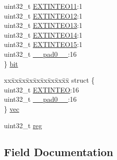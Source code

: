 \begin{DoxyCompactItemize}
\begin{tabbing}
\>uint32\_t \mbox{\hyperlink{union_e_i_c___e_v_c_t_r_l___type_a714c9d160c0d894359b24f3d48662688}{EXTINTEO11}}:1\\
\>uint32\_t \mbox{\hyperlink{union_e_i_c___e_v_c_t_r_l___type_a8f5262d42d527ac6f7452a173ed10dab}{EXTINTEO12}}:1\\
\>uint32\_t \mbox{\hyperlink{union_e_i_c___e_v_c_t_r_l___type_acdd16f5f35025e50e66327d8c39672d5}{EXTINTEO13}}:1\\
\>uint32\_t \mbox{\hyperlink{union_e_i_c___e_v_c_t_r_l___type_a3dae91dcd9363f4accdf32a71cd6c625}{EXTINTEO14}}:1\\
\>uint32\_t \mbox{\hyperlink{union_e_i_c___e_v_c_t_r_l___type_a6dba2a2a030a88aa04620e195a413a34}{EXTINTEO15}}:1\\
\>uint32\_t \mbox{\hyperlink{union_e_i_c___e_v_c_t_r_l___type_a3e57c2ef1c3ffb36722f000cc1156824}{\_\_pad0\_\_}}:16\\
\} \mbox{\hyperlink{union_e_i_c___e_v_c_t_r_l___type_a9b1b106e57aaf6b006bbd8a2b6da9102}{bit}}\\

\end{tabbing}\item 
\begin{tabbing}
xx\=xx\=xx\=xx\=xx\=xx\=xx\=xx\=xx\=\kill
struct \{\\
\>uint32\_t \mbox{\hyperlink{union_e_i_c___e_v_c_t_r_l___type_ab065068288311178bf125255fb206111}{EXTINTEO}}:16\\
\>uint32\_t \mbox{\hyperlink{union_e_i_c___e_v_c_t_r_l___type_a3e57c2ef1c3ffb36722f000cc1156824}{\_\_pad0\_\_}}:16\\
\} \mbox{\hyperlink{union_e_i_c___e_v_c_t_r_l___type_a0503fd5f76f9a37081e26ec5cefb57b9}{vec}}\\

\end{tabbing}\item 
uint32\+\_\+t \mbox{\hyperlink{union_e_i_c___e_v_c_t_r_l___type_a6b91636401516a477989a336376d7b40}{reg}}
\end{DoxyCompactItemize}


\subsection{Field Documentation}
\mbox{\label{union_e_i_c___e_v_c_t_r_l___type_a3e57c2ef1c3ffb36722f000cc1156824}} 
